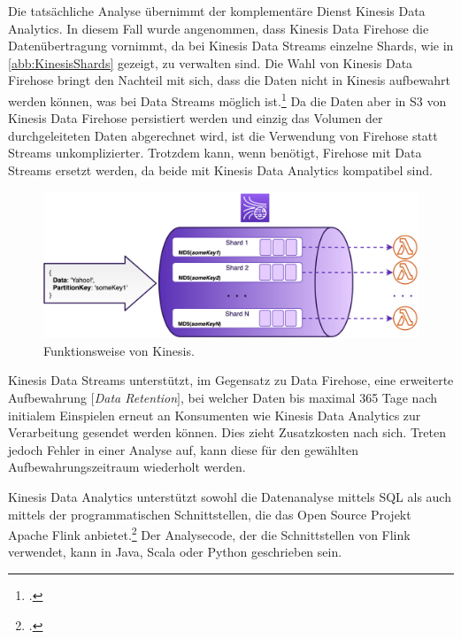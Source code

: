 Die tatsächliche Analyse übernimmt der komplementäre Dienst Kinesis Data Analytics. 
In diesem Fall wurde angenommen, dass Kinesis Data Firehose die Datenübertragung vornimmt, da bei Kinesis Data Streams einzelne Shards, wie in \autoref{abb:KinesisShards} gezeigt, zu verwalten sind. Die Wahl von Kinesis Data Firehose bringt den Nachteil mit sich, dass die Daten nicht in Kinesis aufbewahrt werden können, was bei Data Streams möglich ist.\footcite[Vgl.][]{AmazonWebServicesInc..o.J.bh} Da die Daten aber in \ac{S3} von Kinesis Data Firehose persistiert werden und einzig das Volumen der durchgeleiteten Daten abgerechnet wird, ist die Verwendung von Firehose statt Streams unkomplizierter. Trotzdem kann, wenn benötigt, Firehose mit Data Streams ersetzt werden, da beide mit Kinesis Data Analytics kompatibel sind.

\begin{figure}[H]
\centering
\includegraphics[width=\textwidth]{graphics/kinesis-inner-workings.png}
\caption[Funktionsweise von Kinesis]{Funktionsweise von Kinesis.\footnotemark}
\label{abb:KinesisShards}
\end{figure}

Kinesis Data Streams unterstützt, im Gegensatz zu Data Firehose, eine erweiterte Aufbewahrung $\lbrack$\textit{Data Retention}$\rbrack$, bei welcher Daten bis maximal 365 Tage nach initialem Einspielen erneut an Konsumenten wie Kinesis Data Analytics zur Verarbeitung gesendet werden können. Dies zieht Zusatzkosten nach sich. Treten jedoch Fehler in einer Analyse auf, kann diese für den gewählten Aufbewahrungszeitraum wiederholt werden.

Kinesis Data Analytics unterstützt sowohl die Datenanalyse mittels \ac{SQL} als auch mittels der programmatischen Schnittstellen, die das Open Source Projekt Apache Flink anbietet.\footcite[Vgl.][]{AmazonWebServicesInc..2020f} Der Analysecode, der die Schnittstellen von Flink verwendet, kann in Java, Scala oder Python geschrieben sein.

